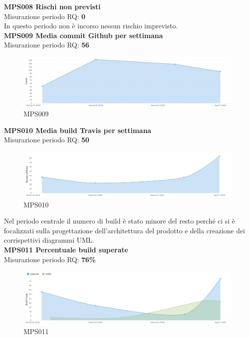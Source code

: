 \documentclass[PianoDiQualifica.tex]{subfiles}
\begin{document}
\textbf{MPS008 Rischi non previsti}\\
Misurazione periodo RQ: \textbf{0}\\
In questo periodo non è incorso nessun rischio imprevisto.\\


\textbf{MPS009 Media commit Github per settimana}\\
Misurazione periodo RQ: \textbf{56}
\begin{figure}[H]
	\centering
	\includegraphics[width=1\linewidth]{RQ/MPS009}
	\caption{MPS009}
	\label{fig:processi}
\end{figure}

\newpage
 
\textbf{MPS010 Media build Travis per settimana}\\
Misurazione periodo RQ: \textbf{50}
\begin{figure}[H]
	\centering
	\includegraphics[width=1\linewidth]{RQ/MPS010}
	\caption{MPS010}
	\label{fig:processi}
\end{figure}
Nel periodo centrale il numero di build è stato minore del resto perché ci si è focalizzati sulla progettazione dell'architettura del prodotto e della creazione dei corrispettivi diagrammi UML.\\


\textbf{MPS011 Percentuale build superate}\\
Misurazione periodo RQ: \textbf{76\%}
\begin{figure}[H]
	\centering
	\includegraphics[width=1\linewidth]{RQ/MPS011}
	\caption{MPS011}
	\label{fig:processi}
\end{figure}
\end{document}
